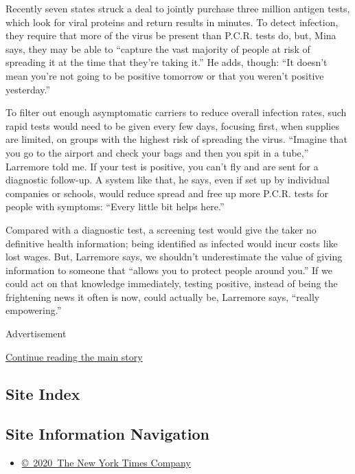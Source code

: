 Recently seven states struck a deal to jointly purchase three million
antigen tests, which look for viral proteins and return results in
minutes. To detect infection, they require that more of the virus be
present than P.C.R. tests do, but, Mina says, they may be able to
``capture the vast majority of people at risk of spreading it at the
time that they're taking it.'' He adds, though: ``It doesn't mean you're
not going to be positive tomorrow or that you weren't positive
yesterday.''

To filter out enough asymptomatic carriers to reduce overall infection
rates, such rapid tests would need to be given every few days, focusing
first, when supplies are limited, on groups with the highest risk of
spreading the virus. ``Imagine that you go to the airport and check your
bags and then you spit in a tube,'' Larremore told me. If your test is
positive, you can't fly and are sent for a diagnostic follow-up. A
system like that, he says, even if set up by individual companies or
schools, would reduce spread and free up more P.C.R. tests for people
with symptoms: ``Every little bit helps here.''

Compared with a diagnostic test, a screening test would give the taker
no definitive health information; being identified as infected would
incur costs like lost wages. But, Larremore says, we shouldn't
underestimate the value of giving information to someone that ``allows
you to protect people around you.'' If we could act on that knowledge
immediately, testing positive, instead of being the frightening news it
often is now, could actually be, Larremore says, ``really empowering.''

Advertisement

\protect\hyperlink{after-bottom}{Continue reading the main story}

\hypertarget{site-index}{%
\subsection{Site Index}\label{site-index}}

\hypertarget{site-information-navigation}{%
\subsection{Site Information
Navigation}\label{site-information-navigation}}

\begin{itemize}
\tightlist
\item
  \href{https://help.nytimes3xbfgragh.onion/hc/en-us/articles/115014792127-Copyright-notice}{©~2020~The
  New York Times Company}
\end{itemize}

